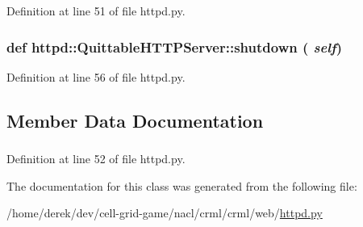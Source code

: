 Definition at line 51 of file httpd.py.

\hypertarget{classhttpd_1_1_quittable_h_t_t_p_server_a7d527531f10ecbcb1db670cf816bbcbd}{
\subsubsection[{shutdown}]{\setlength{\rightskip}{0pt plus 5cm}def httpd::QuittableHTTPServer::shutdown ( {\em self})}}
\label{classhttpd_1_1_quittable_h_t_t_p_server_a7d527531f10ecbcb1db670cf816bbcbd}


Definition at line 56 of file httpd.py.



\subsection{Member Data Documentation}
\hypertarget{classhttpd_1_1_quittable_h_t_t_p_server_a72e565dcba798dfd43d18268e92075a8}{
\subsubsection[{is\_\-running}]{}}
\label{classhttpd_1_1_quittable_h_t_t_p_server_a72e565dcba798dfd43d18268e92075a8}


Definition at line 52 of file httpd.py.



The documentation for this class was generated from the following file:\begin{DoxyCompactItemize}
\item 
/home/derek/dev/cell-\/grid-\/game/nacl/crml/crml/web/\hyperlink{httpd_8py}{httpd.py}\end{DoxyCompactItemize}
